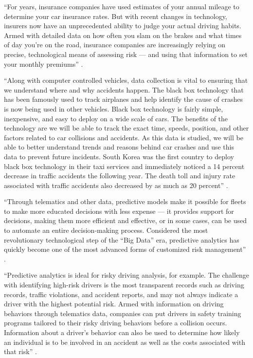 ``For years, insurance companies have used estimates of your annual mileage to determine your car insurance rates. But with recent changes in technology, insurers now have an unprecedented ability to judge your actual driving habits. Armed with detailed data on how often you slam on the brakes and what times of day you're on the road, insurance companies are increasingly relying on precise, technological means of assessing risk — and using that information to set your monthly premiums'' \cite{Fung2016turn}.

``Along with computer controlled vehicles, data collection is vital to ensuring that we understand where and why accidents happen. The black box technology that has been famously used to track airplanes and help identify the cause of crashes is now being used in other vehicles. Black box technology is fairly simple, inexpensive, and easy to deploy on a wide scale of cars. The benefits of the technology are we will be able to track the exact time, speeds, position, and other factors related to car collisions and accidents. As this data is studied, we will be able to better understand trends and reasons behind car crashes and use this data to prevent future incidents. South Korea was the first country to deploy black box technology in their taxi services and immediately noticed a 14 percent decrease in traffic accidents the following year. The death toll and injury rate associated with traffic accidents also decreased by as much as 20 percent'' \cite{Mills2017safety}.

``Through telematics and other data, predictive models make it possible for fleets to make more educated decisions with less expense — it provides support for decisions, making them more efficient and effective, or in some cases, can be used to automate an entire decision-making process. Considered the most revolutionary technological step of the “Big Data” era, predictive analytics has quickly become one of the most advanced forms of customized risk management'' \cite{Suizo2015decisions}.

``Predictive analytics is ideal for risky driving analysis, for example. The challenge with identifying high-risk drivers is the most transparent records such as driving records, traffic violations, and accident reports, and may not always indicate a driver with the highest potential risk. Armed with information on driving behaviors through telematics data, companies can put drivers in safety training programs tailored to their risky driving behaviors before a collision occurs. Information about a driver’s behavior can also be used to determine how likely an individual is to be involved in an accident as well as the costs associated with that risk'' \cite{Suizo2015decisions}.

